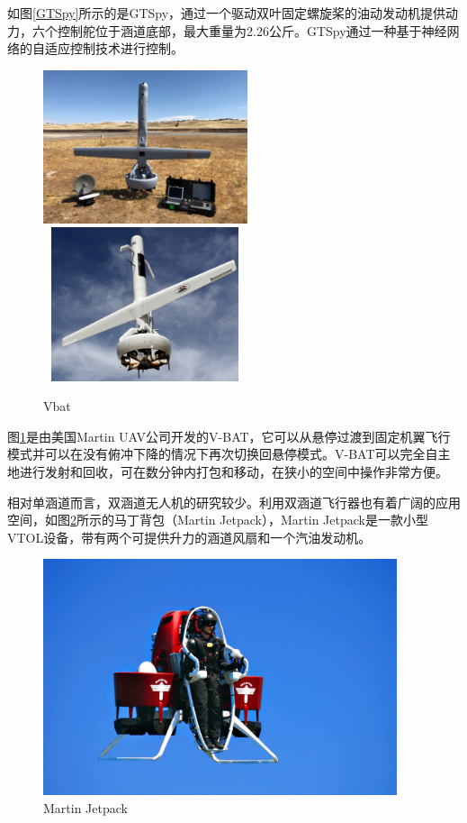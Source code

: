 如图\ref{GTSpy}所示的是GTSpy，通过一个驱动双叶固定螺旋桨的油动发动机提供动力，六个控制舵位于涵道底部，最大重量为2.26公斤。GTSpy通过一种基于神经网络的自适应控制技术进行控制\cite{Johnson_2005}。

\begin{figure}[htbp]
	\centering
	\includegraphics[width=6cm,height=4.5cm]{Fig/Fig_V-bat.jpeg}%
	\includegraphics[width=6cm,height=4.5cm]{Fig/Fig_V-bat1.jpg}
	\caption{\label{Vbat}Vbat}
\end{figure}
图\ref{Vbat}是由美国Martin UAV公司开发的V-BAT\cite{Martin_}，它可以从悬停过渡到固定机翼飞行模式并可以在没有俯冲下降的情况下再次切换回悬停模式。V-BAT可以完全自主地进行发射和回收，可在数分钟内打包和移动，在狭小的空间中操作非常方便。

相对单涵道而言，双涵道无人机的研究较少。利用双涵道飞行器也有着广阔的应用空间，如图\ref{Martin}所示的马丁背包（Martin  Jetpack），Martin Jetpack是一款小型VTOL设备，带有两个可提供升力的涵道风扇和一个汽油发动机。
\begin{figure}[htbp]
	\centering
	\includegraphics[width=10.4cm,height=6.928cm]{Fig/Martin-Jetpack-1.jpg}
	\caption{\label{Martin}Martin Jetpack}
\end{figure}

